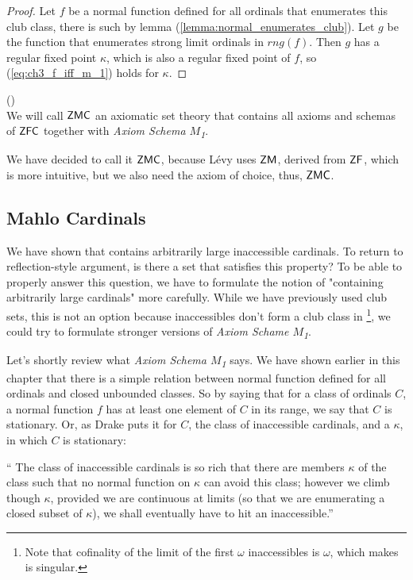 \begin{proof}
Let $f$ be a normal function defined for all ordinals that enumerates this club class, there is such by lemma (\ref{lemma:normal_enumerates_club}). %
Let $g$ be the function that enumerates strong limit ordinals in $rng(f)$. %
Then $g$ has a regular fixed point $\kappa$, which is also a regular fixed point of $f$, so (\ref{eq:ch3_f_iff_m_1}) holds for $\kappa$.

% 
\end{proof}

\begin{definition}{()}\\
We will call $\sf{ZMC}$ an axiomatic set theory that contains all axioms and schemas of $\sf{ZFC}$ together with \emph{Axiom Schema $M$\textsubscript{1}}.
\end{definition}
We have decided to call it $\sf{ZMC}$, because Lévy uses $\sf{ZM}$, derived from $\sf{ZF}$, which is more intuitive, but we also need the axiom of choice, thus, $\sf{ZMC}$.

\subsection{Mahlo Cardinals}
We have shown that  contains arbitrarily large inaccessible cardinals. To return to reflection-style argument, is there a set that satisfies this property? To be able to properly answer this question, we have to formulate the notion of "containing arbitrarily large cardinals" more carefully. While we have previously used club sets, this is not an option because inaccessibles don't form a club class in \footnote{Note that cofinality of the limit of the first $\omega$ inaccessibles is $\omega$, which makes is singular.}, we could try to formulate stronger versions of \emph{Axiom Schame $M$\textsubscript{1}}. 

Let's shortly review what \emph{Axiom Schema $M$\textsubscript{1}} says. We have shown earlier in this chapter that there is a simple relation between normal function defined for all ordinals and closed unbounded classes. So by saying that for a class of ordinals $C$, a normal function $f$ has at least one element of $C$ in its range, we say that $C$ is stationary. Or, as Drake puts it for $C$, the class of inaccessible cardinals, and a $\kappa$, in which $C$ is stationary:
\begin{displayquote}
`` The class of inaccessible cardinals is so rich that there are members $\kappa$ of the class such that no normal function on $\kappa$ can avoid this class; however we climb though $\kappa$, provided we are continuous at limits (so that we are enumerating a closed subset of $\kappa$), we shall eventually have to hit an inaccessible.''
\end{displayquote}

